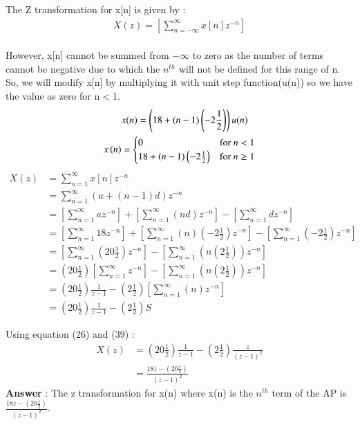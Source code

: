 \documentclass[journal,12pt,twocolumn]{IEEEtran}
\theoremstyle{remark}
\begin{document}
The Z transformation for x[n] is given by : \\
\begin{align}
X(z) =\left[ \sum_{n=-\infty}^{\infty}x[n]z^{-n}\right]
\end{align}
\\
\vspace{15mm}
However, x[n] cannot be summed from $-\infty$ to zero as the number of terms cannot be negative due to which the $n^{th}$ will not be defined for this range of n.\\
So, we will modify x[n] by multiplying it with unit step function(u(n)) so we have the value as zero for n$<$1.
\begin{align}
&x(n) = \left(18 + (n-1)\left(-2\frac{1}{2}\right)\right)u(n) \\
     x\left(n\right) & = \begin{cases}
        0 & \text{for } n < 1 \\
        18 +(n-1)\left(-2\frac{1}{2}\right) & \text{for } n \geq 1
    \end{cases}
\end{align}
\begin{align}
X(z) &= \sum_{n=1}^{\infty}x[n]z^{-n}\\
 &= \sum_{n=1}^{\infty}(a+(n-1)d)z^{-n} \\
 &=  \left[\sum_{n=1}^{\infty}az^{-n} \right] + \left[ \sum_{n=1}^{\infty}(nd)z^{-n} \right] - \left[ \sum_{n=1}^{\infty}dz^{-n} \right]\\
 &=  \left[\sum_{n=1}^{\infty}18z^{-n} \right] + \left[ \sum_{n=1}^{\infty}(n)\left(-2\frac{1}{2}\right)z^{-n} \right] - \left[ \sum_{n=1}^{\infty}\left(-2\frac{1}{2}\right)z^{-n} \right]\\
 &=  \left[\sum_{n=1}^{\infty}\left(20\frac{1}{2}\right)z^{-n} \right] - \left[ \sum_{n=1}^{\infty}\left(n\left(2\frac{1}{2}\right)\right)z^{-n} \right]\\
 &= \left(20\frac{1}{2}\right)\left[\sum_{n=1}^{\infty}z^{-n} \right] - \left[ \sum_{n=1}^{\infty}\left(n\left(2\frac{1}{2}\right)\right)z^{-n} \right]\\
 &= \left(20\frac{1}{2}\right)\frac{1}{z-1} - \left(2\frac{1}{2}\right)\left[ \sum_{n=1}^{\infty}(n)z^{-n} \right]\\
 &= \left(20\frac{1}{2}\right)\frac{1}{z-1} - \left(2\frac{1}{2}\right)S
\end{align}

Using equation (26) and (39) : \\
\begin{align}
X(z) &=  \left(20\frac{1}{2}\right)\frac{1}{z-1} - \left(2\frac{1}{2}\right)\frac{z}{(z-1)^2}\\
&= \frac{18z - \left(20\frac{1}{2}\right)}{(z-1)^2}
\end{align}
\large\textbf{Answer} : \normalsize The z transformation for x(n) where x(n) is the $n^{th}$ term of the AP is $\frac{18z - \left(20\frac{1}{2}\right)}{(z-1)^2}$.
\end{document}
